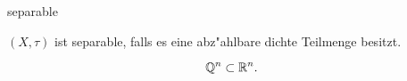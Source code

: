 \documentclass[class=article, crop=false]{standalone}
\begin{document}
\begin{zettel}{separable}
\begin{flashcard}
\begin{definition}[separable]
    $(X ,\tau )$ ist separable, falls es eine abz"ahlbare dichte Teilmenge besitzt.
\end{definition}
\end{flashcard}
\begin{example}
    \[
        \mathbb{Q}^n \subset \mathbb{R}^n
    .\]
\end{example}
\end{zettel}
\end{document}
